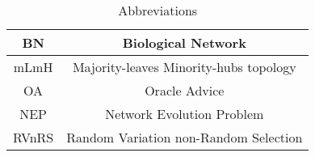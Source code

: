 	\begin{table}[t] %
		\scriptsize %
			\setlength\cellspacetoplimit{4pt} %
			\setlength\cellspacebottomlimit{4pt} %
			\begin{tabular}{c|c}  %
				\hline
					BN & Biological Network
				\\[.01cm] \hline
					mLmH & Majority-leaves Minority-hubs topology
				\\[.01cm] \hline
					OA & Oracle Advice
				\\[.01cm] \hline
					NEP & Network Evolution Problem
				\\[.01cm] \hline
				    RVnRS & Random Variation non-Random Selection
				\\[.01cm] \hline
			\end{tabular}
			\caption{Abbreviations}
			\label{abbrev}	
	\end{table}


